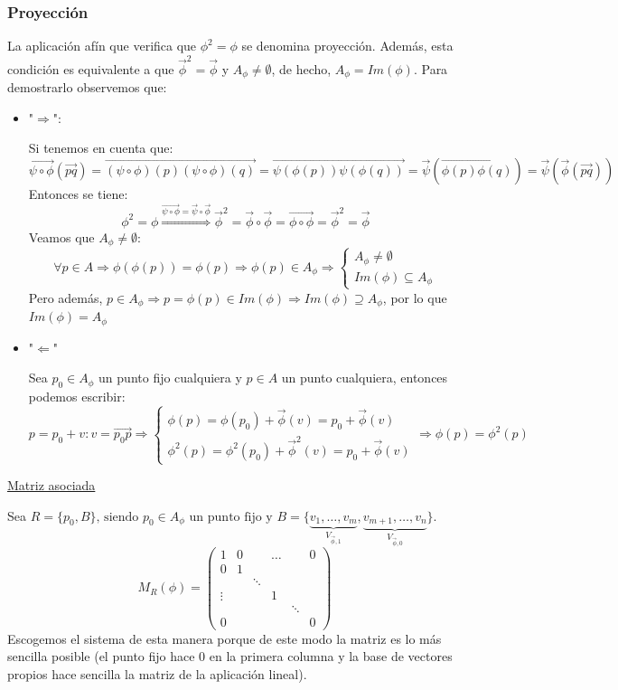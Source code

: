 \documentclass[10pt,a4paper,openright]{book}
\theoremstyle{break}
\begin{document}
\newpage
\subsubsection{Proyección}
La aplicación afín que verifica que $\phi^2 = \phi$ se denomina proyección. Además, esta condición es equivalente a que $\vec{\phi}^2 = \vec{\phi}$ y $A_\phi \neq \emptyset$, de hecho, $A_\phi = Im(\phi)$. Para demostrarlo observemos que:
\begin{itemize}
\item "$\Rightarrow$":

Si tenemos en cuenta que:
$$\overrightarrow{\psi \circ \phi}(\vec{pq}) = \overrightarrow{(\psi \circ \phi)(p) (\psi \circ \phi)(q)} = \overrightarrow{\psi (\phi (p)) \psi (\phi (q))} = \vec{\psi}(\overrightarrow{\phi(p) \phi(q)}) = \vec{\psi} (\vec{\phi} (\vec{pq}))$$
Entonces se tiene:
$$\phi^2 = \phi \overset{\overrightarrow{\psi \circ \phi} = \vec{\psi} \circ \vec{\phi}}{\Longrightarrow} \vec{\phi}^2 = \vec{\phi} \circ \vec{\phi} = \overrightarrow{\phi \circ \phi} = \vec{\phi}^2 = \vec{\phi}$$
Veamos que $A_\phi \neq \emptyset$:
$$\forall p \in A \Rightarrow \phi(\phi(p)) = \phi (p) \Rightarrow \phi(p) \in A_\phi \Rightarrow \begin{cases} A_\phi \neq \emptyset \\ Im(\phi) \subseteq A_\phi \end{cases}$$
Pero además, $p \in A_\phi \Rightarrow p = \phi(p) \in Im(\phi) \Rightarrow Im(\phi) \supseteq A_\phi $, por lo que $Im (\phi) = A_\phi$

\item "$\Leftarrow$"

Sea $p_0 \in A_\phi$ un punto fijo cualquiera y $p \in A$ un punto cualquiera, entonces podemos escribir:
$$p = p_0 + v : v = \vec{p_0p} \Rightarrow \begin{cases} \phi(p) = \phi(p_0) + \vec{\phi}(v) = p_0 + \vec{\phi}(v) \\ \phi^2(p) = \phi^2(p_0) + \vec{\phi}^2(v) = p_0 + \vec{\phi}(v) \end{cases} \Rightarrow \phi(p) = \phi^2 (p)$$
\end{itemize}

\underline{Matriz asociada}

Sea $R = \{p_0, B\} \mbox{, siendo } p_0 \in A_\phi \mbox{ un punto fijo y } B = \{\underbrace{v_1, \ldots, v_m}_{V_{\vec{\phi}, 1}}, \underbrace{v_{m+1}, \ldots, v_n}_{V_{\vec{\phi}, 0}} \}$.
$$M_{R} (\phi) = \left(\begin{array}{c|ccccc}
1  & 0 & & \ldots & & 0 \\
\hline
0  & 1 & & & & \\
& & \ddots & & & \\
\vdots &  & & 1 & & \\
&  & &  & \ddots & \\
0 & & & & & 0
\end{array}
\right)$$
Escogemos el sistema de esta manera porque de este modo la matriz es lo más sencilla posible (el punto fijo hace 0 en la primera columna y la base de vectores propios hace sencilla la matriz de la aplicación lineal).
\end{document}
